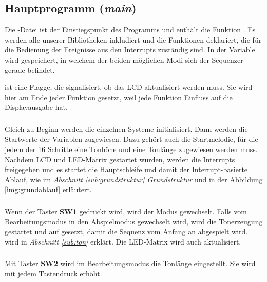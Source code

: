 \subsection{Hauptprogramm (\emph{main})}
Die -Datei ist der Einstiegspunkt des Programms und enthält die Funktion . Es werden alle unserer Bibliotheken inkludiert und die Funktionen deklariert, die für die Bedienung der Ereignisse aus den Interrupts zuständig sind. In der Variable  wird gespeichert, in welchem der beiden möglichen Modi sich der Sequenzer gerade befindet. \par \noindent 
{} ist eine Flagge, die signalisiert, ob das LCD aktualisiert werden muss. Sie wird hier am Ende jeder Funktion gesetzt, weil jede Funktion Einfluss auf die Displayausgabe hat.

\subsubsection{} %
\label{ssub:int main}
Gleich zu Beginn werden die einzelnen Systeme initialisiert. Dann werden die Startwerte der Variablen zugewiesen. Dazu gehört auch die Startmelodie, für die jedem der 16 Schritte eine Tonhöhe und eine Tonlänge zugewiesen werden muss. Nachdem LCD und LED-Matrix gestartet wurden, werden die Interrupts freigegeben und es startet die Hauptschleife und damit der Interrupt-basierte Ablauf, wie im \emph{Abschnitt \ref{sub:grundstruktur} Grundstruktur} und in der Abbildung \ref{img:grundablauf} erläutert.

\subsubsection{} %
\label{ssub:void_button_sw1_pressed}
Wenn der Taster \textbf{SW1} gedrückt wird, wird der Modus gewechselt. Falls vom Bearbeitungsmodus in den Abspielmodus gewechselt wird, wird die Tonerzeugung gestartet und  auf  gesetzt, damit die Sequenz vom Anfang an abgespielt wird.  wird in \emph{Abschnitt \ref{sub:ton}} erklärt. Die LED-Matrix wird auch aktualisiert.

\subsubsection{} %
\label{ssub:void_button_sw2_pressed}
Mit Taster \textbf{SW2} wird im Bearbeitungsmodus die Tonlänge eingestellt. Sie wird mit jedem Tastendruck erhöht.


